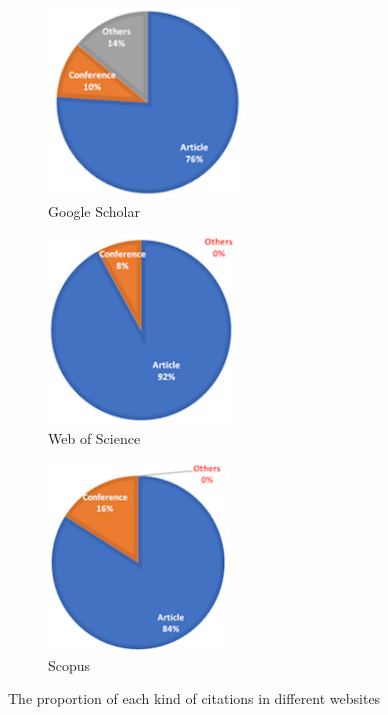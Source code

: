 \documentclass[runningheads]{llncs}
\begin{document}
\begin{figure}[ht]

\begin{subfigure}{0.5\textwidth}
\includegraphics[width=0.9\linewidth, height=5cm]{Picture1.png}
\caption{Google Scholar}
\label{fig:subim1}
\end{subfigure}
\begin{subfigure}{0.5\textwidth}
\includegraphics[width=0.9\linewidth, height=5cm]{Picture2.png}
\caption{Web of Science}
\label{fig:subim2}
\end{subfigure}
\begin{subfigure}{0.5\textwidth}

\includegraphics[width=0.9\linewidth, height=5cm]{Picture3.png}
\caption{Scopus}
\label{fig:subim3}
\end{subfigure}
\captionsetup{labelsep = period}
\caption{The proportion of each kind of citations in different websites}
\label{fig2}
\end{figure}
\par
\noindent\\
\end{document}
